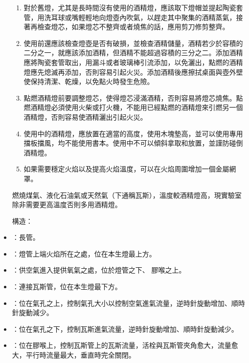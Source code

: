 \documentclass[a4paper,12pt]{article}
\begin{document}
\begin{itemize}
\begin{enumerate}
\item 對於舊燈，尤其是長時間沒有使用的酒精燈，應該取下燈帽並提起陶瓷套管，用洗耳球或嘴輕輕地向燈壺內吹氣，以趕走其中聚集的酒精蒸氣，接著再檢查燈芯，如果燈芯不整齊或者燒焦的話，應用剪刀修剪整齊。
\item 使用前還應該檢查燈壺是否有破損，並檢查酒精儲量，酒精若少於容積的二分之一，就應該添加酒精，但酒精不能超過容積的三分之二。添加酒精應將陶瓷套管取出，用漏斗或者玻璃棒引流添加，以免灑出，點燃的酒精燈應先熄滅再添加，否則容易引起火災。添加酒精後應擦拭桌面與壺外壁使保持清潔、乾燥，以免點火時發生危險。
\item 點燃酒精燈前要調整燈芯，使得燈芯浸滿酒精，否則容易將燈芯燒焦。點燃酒精燈必須使用火柴或打火機，不能用已經點燃的酒精燈來引燃另一個酒精燈，否則容易使酒精灑出引起火災。
\item 使用中的酒精燈，應放置在適當的高度，使用木塊墊高，並可以使用專用擋板擋風，均不能使用書本。使用中不可以傾斜拿取和放置，並謹防碰倒酒精燈。
\item 如果需要穩定火焰以及提高火焰溫度，可以在火焰周圍增加一個金屬網罩。
\end{enumerate}
燃燒煤氣、液化石油氣或天然氣（下通稱瓦斯），溫度較酒精燈高，現實驗室除非需要更高溫度否則多用酒精燈。

構造：
\bit
\item {}：長管。
\item {}：燈管上端火焰所在之處，位在本生燈最上方。
\item {}：供空氣進入提供氧氣之處，位於燈管之下、 膠喉之上。
\item {}：連接瓦斯管，位在本生燈最下方。
\item {}：位在氣孔之上，控制氣孔大小以控制空氣進氣流量，逆時針旋動增加、順時針旋動減少。
\item {}：位在氣孔之下，控制瓦斯進氣流量，逆時針旋動增加、順時針旋動減少。
\item {}：位在膠喉上，控制瓦斯管上的瓦斯流量，活栓與瓦斯管夾角愈大，流量愈大，平行時流量最大，垂直時完全關閉。
\eit


\end{itemize}
\end{document}
